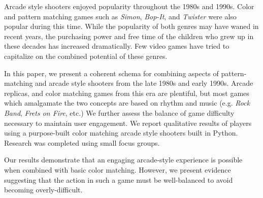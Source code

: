 Arcade style shooters enjoyed popularity throughout the 1980s and 1990s.
Color and pattern matching games such as \textit{Simon}, \textit{Bop-It},
and \textit{Twister} were also popular during this time.  While the
popularity of both genres may have waned in recent years, the
purchasing power and free time of the children who grew up in these
decades has increased dramatically.  Few video games have tried to
capitalize on the combined potential of these genres.

In this paper, we present a coherent schema for combining aspects of
pattern-matching and arcade style shooters from the late 1980s and
early 1990s.  Arcade replicas, and color matching games from this era
are plentiful, but most games which amalgamate the two concepts are based on
rhythm and music (e.g. \textit{Rock Band}, \textit{Frets on Fire}, etc.) We
further assess the balance of game difficulty necessary to maintain
user engagement.  We report qualitative results of players using a
purpose-built color matching arcade style shooters built in Python.
Research was completed using small focus groups.

Our results demonstrate that an engaging arcade-style experience is possible
when combined with basic color matching. However, we present evidence
suggesting that the action in such a game must be well-balanced to avoid
becoming overly-difficult.
